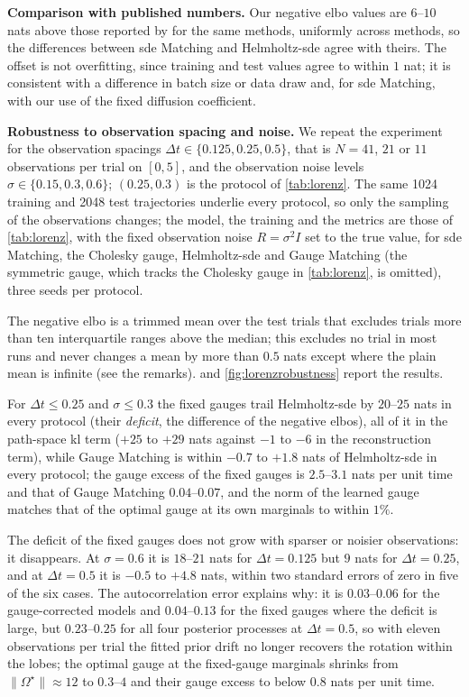 \documentclass{article} %
\newcommand{\gauge}{\Omega}
\begin{document}
\textbf{Comparison with published numbers.} Our negative \gls{elbo} values are $6$--$10$ nats above those reported by \citet{smith2026closing} for the same methods, uniformly across methods, so the differences between \gls{sde} Matching and Helmholtz-\gls{sde} agree with theirs. The offset is not overfitting, since training and test values agree to within $1$ nat; it is consistent with a difference in batch size or data draw and, for \gls{sde} Matching, with our use of the fixed diffusion coefficient.

\textbf{Robustness to observation spacing and noise.} We repeat the experiment for the observation spacings $\Delta t \in \{0.125, 0.25, 0.5\}$, that is $N = 41$, $21$ or $11$ observations per trial on $[0, 5]$, and the observation noise levels $\sigma \in \{0.15, 0.3, 0.6\}$; $(0.25, 0.3)$ is the protocol of \cref{tab:lorenz}. The same 1024 training and 2048 test trajectories underlie every protocol, so only the sampling of the observations changes; the model, the training and the metrics are those of \cref{tab:lorenz}, with the fixed observation noise $R = \sigma^2 I$ set to the true value, for \gls{sde} Matching, the Cholesky gauge, Helmholtz-\gls{sde} and Gauge Matching (the symmetric gauge, which tracks the Cholesky gauge in \cref{tab:lorenz}, is omitted), three seeds per protocol.

The negative \gls{elbo} is a trimmed mean over the test trials that excludes trials more than ten interquartile ranges above the median; this excludes no trial in most runs and never changes a mean by more than $0.5$ nats except where the plain mean is infinite (see the remarks).  and \cref{fig:lorenzrobustness} report the results.

For $\Delta t \le 0.25$ and $\sigma \le 0.3$ the fixed gauges trail Helmholtz-\gls{sde} by $20$--$25$ nats in every protocol (their \emph{deficit}, the difference of the negative \glspl{elbo}), all of it in the path-space \gls{kl} term ($+25$ to $+29$ nats against $-1$ to $-6$ in the reconstruction term), while Gauge Matching is within $-0.7$ to $+1.8$ nats of Helmholtz-\gls{sde} in every protocol; the gauge excess of the fixed gauges is $2.5$--$3.1$ nats per unit time and that of Gauge Matching $0.04$--$0.07$, and the norm of the learned gauge matches that of the optimal gauge at its own marginals to within $1\%$.

The deficit of the fixed gauges does not grow with sparser or noisier observations: it disappears. At $\sigma = 0.6$ it is $18$--$21$ nats for $\Delta t = 0.125$ but $9$ nats for $\Delta t = 0.25$, and at $\Delta t = 0.5$ it is $-0.5$ to $+4.8$ nats, within two standard errors of zero in five of the six cases. The autocorrelation error explains why: it is $0.03$--$0.06$ for the gauge-corrected models and $0.04$--$0.13$ for the fixed gauges where the deficit is large, but $0.23$--$0.25$ for all four posterior processes at $\Delta t = 0.5$, so with eleven observations per trial the fitted prior drift no longer recovers the rotation within the lobes; the optimal gauge at the fixed-gauge marginals shrinks from $\|\gauge^\star\| \approx 12$ to $0.3$--$4$ and their gauge excess to below $0.8$ nats per unit time.
\end{document}
